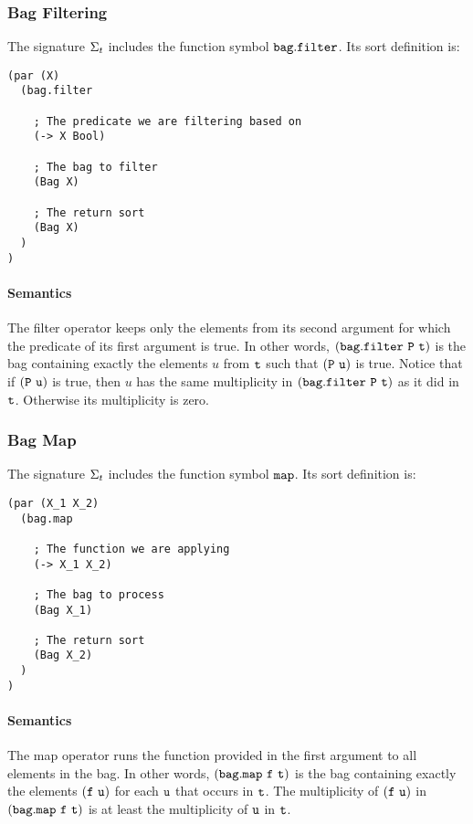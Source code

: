 \documentclass[english,a4paper,10pt]{article}
\begin{document}
\subsubsection{Bag Filtering}
The signature $\Sigma_{t}$ includes 
the function symbol ${\tt bag.filter}$. Its sort definition is:

\begin{verbatim}
(par (X)
  (bag.filter
  
    ; The predicate we are filtering based on
    (-> X Bool)
  
    ; The bag to filter
    (Bag X)
    
    ; The return sort
    (Bag X)
  )
)
\end{verbatim}

\paragraph{Semantics}
The filter operator keeps only the elements
from its second argument
for which the predicate of its first argument is true.
In other words,
${\tt (bag.filter\ P\ t)}$
is the bag containing exactly
the elements $u$ from ${\tt t}$
such that ${\tt (P\ u)}$ is true.
Notice that if ${\tt (P\ u)}$ is true,
then $u$ has the same multiplicity in ${\tt (bag.filter\ P\ t)}$
as it did in ${\tt t}$. Otherwise its multiplicity is zero. 

\subsubsection{Bag Map}
The signature $\Sigma_{t}$ includes 
the function symbol ${\tt map}$. Its sort definition is:

\begin{verbatim}
(par (X_1 X_2)
  (bag.map
    
    ; The function we are applying
    (-> X_1 X_2)
  
    ; The bag to process
    (Bag X_1)
    
    ; The return sort
    (Bag X_2)
  )
)
\end{verbatim}

\paragraph{Semantics}
The map operator runs the function provided
in the first argument to all elements in the bag.
In other words,
${\tt (bag.map\ f\ t)}$
is the bag containing exactly
the elements $\syntax{(f\ u)}$
for each ${\tt u}$ that occurs in ${\tt t}$.
The multiplicity of $\syntax{(f\ u)}$
in ${\tt (bag.map\ f\ t)}$
is at least the multiplicity of ${\tt u}$ in ${\tt t}$.
\end{document}
